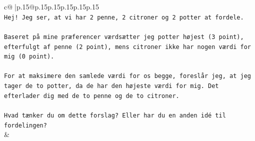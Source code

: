 \documentclass{article}
\begin{document}
{\begin{supertabular}{c@{$\;$}|p{.15\linewidth}@{}p{.15\linewidth}p{.15\linewidth}p{.15\linewidth}p{.15\linewidth}p{.15\linewidth}}
{{{\\ 
\texttt{Hej! Jeg ser, at vi har 2 penne, 2 citroner og 2 potter at fordele.} \\
\\ 
\texttt{Baseret på mine præferencer værdsætter jeg potter højest (3 point), efterfulgt af penne (2 point), mens citroner ikke har nogen værdi for mig (0 point).} \\
\\ 
\texttt{For at maksimere den samlede værdi for os begge, foreslår jeg, at jeg tager de to potter, da de har den højeste værdi for mig. Det efterlader dig med de to penne og de to citroner.} \\
\\ 
\texttt{Hvad tænker du om dette forslag? Eller har du en anden idé til fordelingen?} \\
            }
        }
    }
    & \\ \\


\end{supertabular}}
\end{document}
